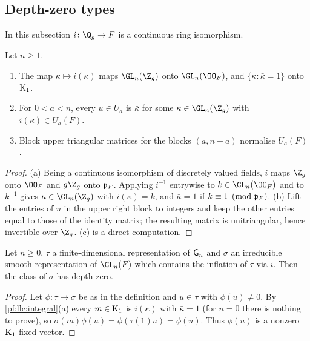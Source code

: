 \subsection{Depth-zero types}\label{pf:llc:sec-types}

In this subsection $i\colon\Q_g\to F$ is a continuous ring isomorphism.

\begin{lemma}\label{pf:llc:integral}
Let $n\ge1$.
\begin{enumerate}[label=(\alph*)]
\item The map $\kappa\mapsto i(\kappa)$ maps $\GL_n(\Z_g)$ onto $\GL_n(\OO_F)$, and $\{\kappa:\bar\kappa=1\}$ onto
  $\mathrm{K}_1$.
\item For $0<a<n$, every $u\in U_a$ is $\bar\kappa$ for some $\kappa\in\GL_n(\Z_g)$ with $i(\kappa)\in U_a(F)$.
\item Block upper triangular matrices for the blocks $(a,n-a)$ normalise $U_a(F)$.
\end{enumerate}
\end{lemma}

\begin{proof}
(a) Being a continuous isomorphism of discretely valued fields, $i$ maps $\Z_g$ onto $\OO_F$ and $g\Z_g$ onto
$\mathfrak p_F$. Applying $i^{-1}$ entrywise to $k\in\GL_n(\OO_F)$ and to $k^{-1}$ gives $\kappa\in\GL_n(\Z_g)$ with
$i(\kappa)=k$, and $\bar\kappa=1$ if $k\equiv1\pmod{\mathfrak p_F}$. (b) Lift the entries of $u$ in the upper right block
to integers and keep the other entries equal to those of the identity matrix; the resulting matrix is
unitriangular, hence invertible over $\Z_g$. (c) is a direct computation.
\end{proof}

\begin{lemma}\label{pf:llc:ldepth}
Let $n\ge0$, $\tau$ a finite-dimensional representation of $\mathsf{G}_n$ and $\sigma$ an irreducible smooth
representation of $\GL_n(F)$ which contains the inflation of $\tau$ via $i$. Then the class of $\sigma$ has
depth zero. 
\end{lemma}

\begin{proof}
Let $\phi\colon\tau\to\sigma$ be as in the definition and $u\in\tau$ with $\phi(u)\ne0$. By
\cref{pf:llc:integral}(a) every $m\in\mathrm{K}_1$ is $i(\kappa)$ with $\bar\kappa=1$ (for $n=0$ there is nothing to
prove), so $\sigma(m)\phi(u)=\phi(\tau(1)u)=\phi(u)$. Thus $\phi(u)$ is a nonzero $\mathrm{K}_1$-fixed vector.
\end{proof}

